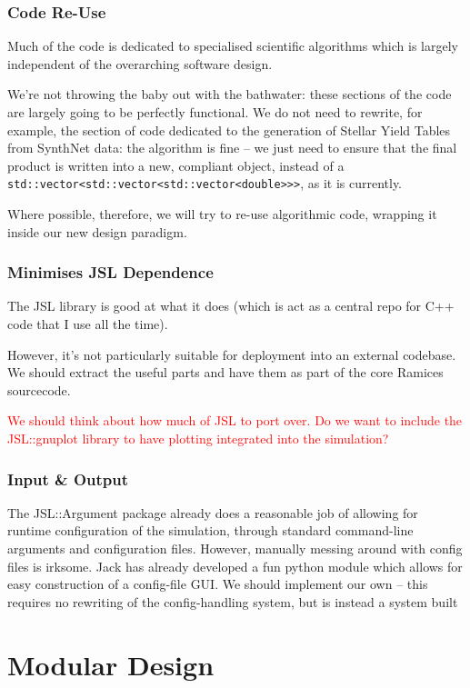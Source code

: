 \documentclass[a4paper,10pt]{article}
\begin{document}
				\subsubsection{Code Re-Use}

					Much of the code is dedicated to specialised scientific algorithms which is largely independent of the overarching software design.

					We're not throwing the baby out with the bathwater: these sections of the code are largely going to be perfectly functional. We do not need to rewrite, for example, the section of code dedicated to the generation of Stellar Yield Tables from SynthNet data: the algorithm is fine -- we just need to ensure that the final product is written into a new, compliant object, instead of a \texttt{std::vector<std::vector<std::vector<double>>>}, as it is currently.
					
					Where possible, therefore, we will try to re-use algorithmic code, wrapping it inside our new design paradigm.
				
				\subsubsection{Minimises JSL Dependence}
					
					The JSL library is good at what it does (which is act as a central repo for C++ code that I use all the time). 

					However, it's not particularly suitable for deployment into an external codebase. We should extract the useful parts and have them as part of the core Ramices sourcecode.

					\textcolor{red}{We should think about how much of JSL to port over. Do we want to include the JSL::gnuplot library to have plotting integrated into the simulation?} 
				\subsubsection{Input \& Output}
					The JSL::Argument package already does a reasonable job of allowing for runtime configuration of the simulation, through standard command-line arguments and configuration files. However, manually messing around with config files is irksome. Jack has already developed a fun python module which allows for easy construction of a config-file GUI. We should implement our own -- this requires no rewriting of the config-handling system, but is instead a system built 


	\newpage
		\section{Modular Design}
			
\end{document}

